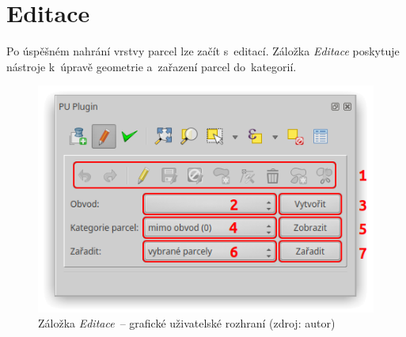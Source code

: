 \newpage

\section{Editace}
\label{manual_editace}

Po úspěšném nahrání vrstvy parcel lze začít s~editací. Záložka
\textit{Editace} poskytuje nástroje k~úpravě geometrie a~zařazení
parcel do~kategorií.

	\begin{figure}[H] \centering
		\includegraphics[width=.55\textwidth]{./pictures/editace_gui.png}
		\caption[Záložka \textit{Editace}~– grafické
uživatelské rozhraní]{Záložka \textit{Editace}~– grafické uživatelské
rozhraní (zdroj: autor)}
		\label{fig:manual_editace_gui}
 	\end{figure}

